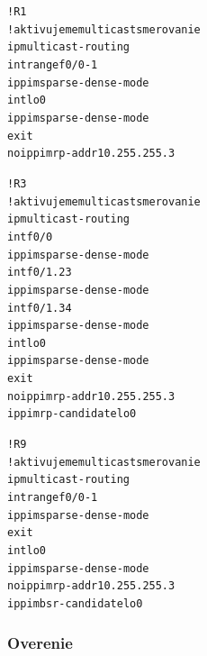 \documentclass[12pt,twoside,a4paper]{report}
\begin{document}
\noindent
{\selectfont
\begin{small}
\begin{alltt}
!R1
!aktivujeme multicast smerovanie
ip multicast-routing
int range f0/0 - 1
  ip pim sparse-dense-mode
int lo0
  ip pim sparse-dense-mode
  exit
no ip pim rp-addr 10.255.255.3

!R3
!aktivujeme multicast smerovanie
ip multicast-routing
int f0/0
  ip pim sparse-dense-mode
int f0/1.23
  ip pim sparse-dense-mode
int f0/1.34
  ip pim sparse-dense-mode
int lo0
  ip pim sparse-dense-mode
  exit
no ip pim rp-addr 10.255.255.3
ip pim rp-candidate lo0

!R9
!aktivujeme multicast smerovanie
ip multicast-routing
int range f0/0 - 1
  ip pim sparse-dense-mode
  exit
int lo0
  ip pim sparse-dense-mode
no ip pim rp-addr 10.255.255.3
ip pim bsr-candidate lo0
\end{alltt}
\end{small}
}

\subsubsection{Overenie}
\end{document}
